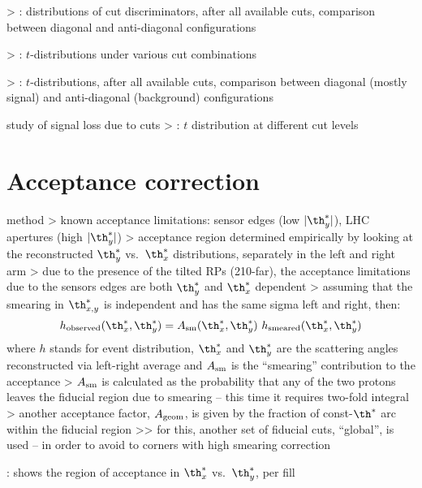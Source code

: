 \>> : distributions of cut discriminators, after all available cuts, comparison between diagonal and anti-diagonal configurations

\>> : $t$-distributions under various cut combinations

\>> : $t$-distributions, after all available cuts, comparison between diagonal (mostly signal) and anti-diagonal (background) configurations


\> study of signal loss due to cuts
\>> : $t$ distribution at different cut levels



\section{Acceptance correction}

\> method
\>> known acceptance limitations: sensor edges (low $|\th_y^*|$), LHC apertures (high $|\th_y^*|$)
\>> acceptance region determined empirically by looking at the reconstructed $\th_y^*$ vs.~$\th_x^*$ distributions, separately in the left and right arm
\>> due to the presence of the tilted RPs (210-far), the acceptance limitations due to the sensors edges are both $\th_y^*$ and $\th_x^*$ dependent
\>> assuming that the smearing in $\th_{x, y}^*$ is independent and has the same sigma left and right, then:
$$h_{\rm observed}(\th_x^*, \th_y^*) = A_{\rm sm}(\th_x^*, \th_y^*)\ h_{\rm smeared}(\th_x^*, \th_y^*)$$
where $h$ stands for event distribution, $\th_x^*$ and $\th_y^*$ are the scattering angles reconstructed via left-right average and $A_{\rm sm}$ is the ``smearing'' contribution to the acceptance
\>> $A_{\rm sm}$ is calculated as the probability that any of the two protons leaves the fiducial region due to smearing -- this time it requires two-fold integral
\>> another acceptance factor, $A_{\rm geom}$, is given by the fraction of const-$\th^*$ arc within the fiducial region
\>>> for this, another set of fiducial cuts, ``global'', is used -- in order to avoid to corners with high smearing correction

\> : shows the region of acceptance in $\th_x^*$ vs.~$\th_y^*$, per fill

